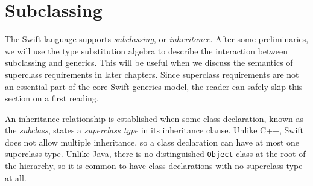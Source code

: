 \documentclass[../generics]{subfiles}
\begin{document}
\section{Subclassing}\label{sec:subclassing}

The Swift language supports \emph{subclassing}, or \emph{inheritance}. After some preliminaries, we will use the type substitution algebra to describe the interaction between subclassing and generics. This will be useful when we discuss the semantics of superclass requirements in later chapters. Since superclass requirements are not an essential part of the core Swift generics model, the reader can safely skip this section on a first reading.

An inheritance relationship is established when some class declaration, known as the \emph{subclass}, states a \emph{superclass type} in its inheritance clause. Unlike C++, Swift does not allow multiple inheritance, so a class declaration can have at most one superclass type. Unlike Java, there is no distinguished \texttt{Object} class at the root of the hierarchy, so it is common to have class declarations with no superclass type at all.
\end{document}
